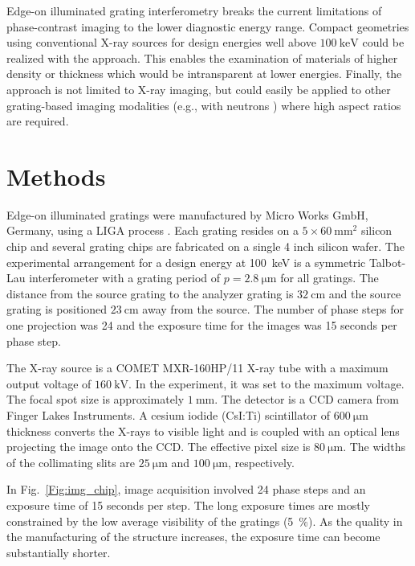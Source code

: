 \documentclass[aps,prl,preprint]{revtex4-1}
\begin{document}
Edge-on illuminated grating interferometry breaks the current limitations of
phase-contrast imaging to the lower diagnostic energy range. Compact
geometries  using conventional X-ray sources for design energies well above
$\SI{100}{\kilo\electronvolt}$ could be realized with the approach. This
enables the examination of materials of higher density or thickness which
would be intransparent at lower energies. Finally, the approach is not
limited to X-ray imaging, but could easily be applied to other grating-based
imaging modalities (e.g., with neutrons \cite{Grunzweig2008}) where high
aspect ratios are required.

\section*{Methods}
Edge-on illuminated gratings were manufactured by Micro
Works GmbH, Germany, using a LIGA process \cite{Kenntner2010}. Each grating
resides on a $5 \times \SI{60}{\milli\metre^2}$ silicon chip and several
grating chips are fabricated on a single 4 inch silicon wafer. The
experimental arrangement for a design energy at \SI{100}{\kilo\electronvolt}
is a symmetric Talbot-Lau interferometer with a grating period of $p =
\SI{2.8}{\micro \metre}$ for all gratings. The distance from the source
grating to the analyzer grating is $\SI{32}{\centi\metre}$ and the source
grating is positioned $\SI{23}{\centi\metre}$ away from the source. The
number of phase steps for one projection was 24 \cite{Weitkamp2005} and the
exposure time for the images was 15 seconds per phase step.

The X-ray source is a COMET MXR-160HP/11 X-ray tube with a maximum output
voltage of $\SI{160}{\kilo\volt}$. In the experiment, it was set to the
maximum voltage. The focal spot size is approximately
$\SI{1}{\milli\metre}$. The detector is a CCD camera from Finger Lakes
Instruments. A cesium iodide (CsI:Ti) scintillator of $\SI{600}{\micro
\metre}$ thickness converts the X-rays to visible light and is coupled with
an optical lens projecting the image onto the CCD. The effective pixel size
is $\SI{80}{\micro \metre}$. The widths of the collimating slits are
$\SI{25}{\micro \metre}$ and $\SI{100}{\micro \metre}$, respectively.

In Fig.~\ref{Fig:img_chip}, image acquisition involved 24 phase steps
\cite{Weitkamp2005} and an exposure time of 15 seconds per step. The long
exposure times are mostly constrained by the low average visibility of the
gratings (\SI{5}{\percent}). As the quality in the manufacturing of the
structure increases, the exposure time can become substantially shorter.
\end{document}
